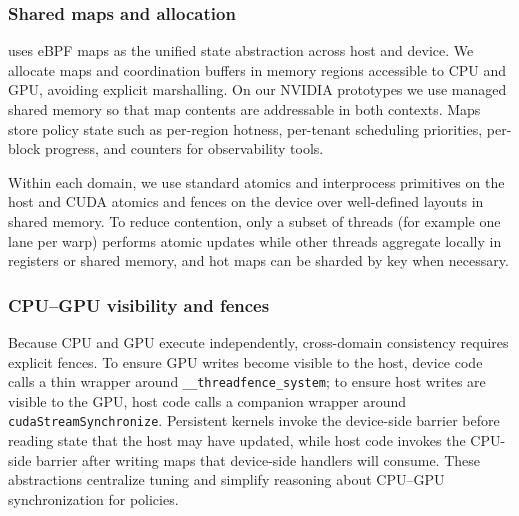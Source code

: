 \subsubsection{Shared maps and allocation}

\sys uses eBPF maps as the unified state abstraction across host and device. We
allocate maps and coordination buffers in memory regions accessible to CPU and GPU,
avoiding explicit marshalling. On our NVIDIA prototypes we use managed shared
memory so that map contents are addressable in both contexts. Maps store policy
state such as per-region hotness, per-tenant scheduling priorities, per-block
progress, and counters for observability tools.

Within each domain, we use standard atomics and interprocess primitives on the
host and CUDA atomics and fences on the device over well-defined layouts in
shared memory. To reduce contention, only a subset of threads (for example one
lane per warp) performs atomic updates while other threads aggregate locally in
registers or shared memory, and hot maps can be sharded by key when necessary.

\subsubsection{CPU–GPU visibility and fences}

Because CPU and GPU execute independently, cross-domain consistency requires explicit fences. To ensure GPU writes become visible to the host, device code calls a thin wrapper around \texttt{\_\_threadfence\_system}; to ensure host writes are visible to the GPU, host code calls a companion wrapper around \texttt{cudaStreamSynchronize}. Persistent kernels invoke the device-side barrier before reading state that the host may have updated, while host code invokes the CPU-side barrier after writing maps that device-side handlers will consume. These abstractions centralize tuning and simplify reasoning about CPU--GPU synchronization for \sys policies.

